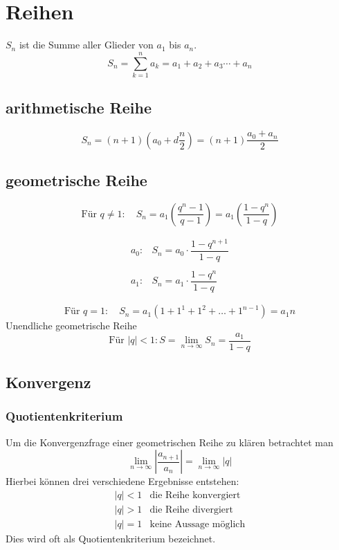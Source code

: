 \section{Reihen}
$S_n$ ist die Summe aller Glieder von $a_1$ bis $a_n$. 
\[ \boxed{S_n = \sum_{k=1}^{n} a_k = a_1 + a_2 + a_3 \cdots + a_n} \]

\subsection{arithmetische Reihe}
\[ \boxed{S_n = \left(n + 1\right)\left(a_0 + d \frac{n}{2}\right) = \left(n + 1\right) \frac{a_0 + a_n}{2}} \]

\subsection{geometrische Reihe}
\[ \boxed{\text{Für } q \neq 1: \quad S_n = a_1 \left(  \frac{q^n - 1}{q - 1} \right) = a_1 \left(  \frac{1 - q^n}{1 - q} \right)} \]

\[ \boxed{\begin{array}{ll}
a_0 :& S_n = a_0 \cdot \dfrac{1-q^{n+1}}{1-q} \\ 
& \\
a_1 :& S_n = a_1 \cdot \dfrac{1-q^n}{1-q}
\end{array}} \]

\[ \boxed{\text{Für } q = 1: \quad S_n = a_1 \left(1+1^1 + 1^2 + \ldots + 1^{n-1}\right) = a_1 n} \]
Unendliche geometrische Reihe
\[ \boxed{\text{Für } |q| < 1: S = \lim_{n \rightarrow \infty} S_n = \frac{a_1}{1 - q}} \] 

\subsection{Konvergenz}

\subsubsection*{Quotientenkriterium}
Um die Konvergenzfrage einer geometrischen Reihe zu klären betrachtet man
\[ \lim\limits_{n \rightarrow \infty} \left| \frac{a_{n+1}}{a_n} \right| = \lim\limits_{n \rightarrow \infty} \left| q \right| \]
Hierbei können drei verschiedene Ergebnisse entstehen:
\[ \boxed{\begin{array}{ll}
|q| < 1 & \text{die Reihe konvergiert} \\
|q| > 1 & \text{die Reihe divergiert} \\
|q| = 1 & \text{keine Aussage möglich}
\end{array}} \]
Dies wird oft als Quotientenkriterium bezeichnet.

